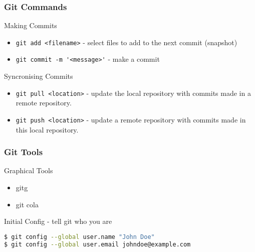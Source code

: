 \documentclass{beamer}
\begin{document}
\begin{frame}[fragile]
\frametitle{Git Commands}

\begin{block}{Making Commits}
\begin{itemize}
\item \verb|git add <filename>| - select files to add to the next commit (snapshot)
\item \verb|git commit -m '<message>'| - make a commit
\end{itemize}
\end{block}


\begin{block}{Syncronising Commits}
\begin{itemize}
\item \verb|git pull <location>| - update the local repository with commits made in a remote repository.
\item \verb|git push <location>| - update a remote repository with commits made in this local repository.
\end{itemize}
\end{block}
\end{frame}


\begin{frame}[fragile]
\frametitle{Git Tools}

\begin{block}{Graphical Tools}
\begin{itemize}
\item gitg
\item git cola
\end{itemize}
\end{block}
\end{frame}







\begin{frame}[fragile]
\begin{block}{Initial Config - tell git who you are}
\begin{lstlisting}[language=bash,basicstyle=\ttfamily\scriptsize]
$ git config --global user.name "John Doe"
$ git config --global user.email johndoe@example.com
\end{lstlisting}
\end{block}
\end{frame}
\end{document}

